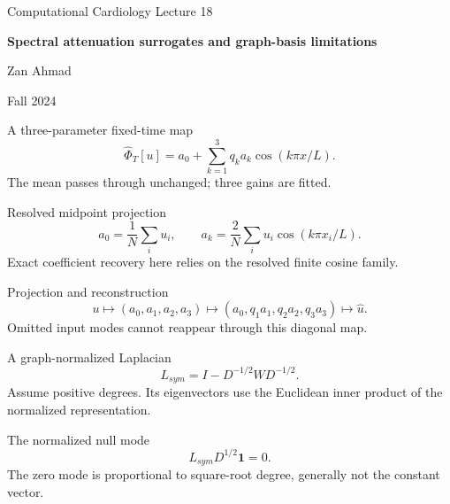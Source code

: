 \documentclass[aspectratio=169,11pt]{beamer}
\newcommand{\notestarget}{notes.pdf}\newcommand{\noteslabel}{Notes}
\begin{document}
\begin{frame}[plain]\vfill
{\small\color{accent} Computational Cardiology \quad Lecture 18}\par\medskip
{\raggedright{}\LARGE\bfseries\color{ink} Spectral attenuation surrogates and graph-basis limitations}\par\bigskip
Zan Ahmad\par\smallskip
{\small Fall 2024}\par\vfill\end{frame}
\renewcommand{\notestarget}{notes.pdf\#note-the-research-operator-and-the-finite-baseline}
\begin{frame}[t,fragile,label=slide-a-three-parameter-fixed-time-map]{A three-parameter fixed-time map}
\[\widehat\Phi_T[u]=a_0+\sum_{k=1}^3q_k a_k\cos(k\pi x/L).\]\pause{} The mean passes through unchanged; three gains are fitted.
\end{frame}
\renewcommand{\notestarget}{notes.pdf\#note-projection-inner-products-and-null-modes}
\begin{frame}[t,fragile,label=slide-resolved-midpoint-projection]{Resolved midpoint projection}
\[a_0=\frac1N\sum_i u_i,\qquad a_k=\frac2N\sum_i u_i\cos(k\pi x_i/L).\]\pause{} Exact coefficient recovery here relies on the resolved finite cosine family.
\end{frame}
\renewcommand{\notestarget}{notes.pdf\#note-projection-inner-products-and-null-modes}
\begin{frame}[t,fragile,label=slide-projection-and-reconstruction]{Projection and reconstruction}
\[u\longmapsto(a_0,a_1,a_2,a_3)\longmapsto(a_0,q_1a_1,q_2a_2,q_3a_3)\longmapsto\widehat u.\]\pause{} Omitted input modes cannot reappear through this diagonal map.
\end{frame}
\renewcommand{\notestarget}{notes.pdf\#note-projection-inner-products-and-null-modes}
\begin{frame}[t,fragile,label=slide-a-graph-normalized-laplacian]{A graph-normalized Laplacian}
\[L_{sym}=I-D^{-1/2}WD^{-1/2}.\]\pause{} Assume positive degrees. Its eigenvectors use the Euclidean inner product of the normalized representation.
\end{frame}
\renewcommand{\notestarget}{notes.pdf\#note-projection-inner-products-and-null-modes}
\begin{frame}[t,fragile,label=slide-the-normalized-null-mode]{The normalized null mode}
\[L_{sym}D^{1/2}\boldsymbol1=0.\]\pause{} The zero mode is proportional to square-root degree, generally not the constant vector.
\end{frame}
\end{document}
